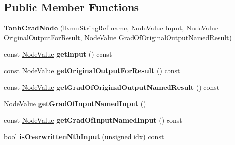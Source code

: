 \subsection*{Public Member Functions}
\begin{DoxyCompactItemize}
\item 
\mbox{\label{classglow_1_1_tanh_grad_node_a22acf1da0c7ed69537ed7512a9f4f842}} 
{\bfseries Tanh\+Grad\+Node} (llvm\+::\+String\+Ref name, \hyperlink{structglow_1_1_node_value}{Node\+Value} Input, \hyperlink{structglow_1_1_node_value}{Node\+Value} Original\+Output\+For\+Result, \hyperlink{structglow_1_1_node_value}{Node\+Value} Grad\+Of\+Original\+Output\+Named\+Result)
\item 
\mbox{\label{classglow_1_1_tanh_grad_node_ad4e3ce62981a375538c398e67b4afa2d}} 
const \hyperlink{structglow_1_1_node_value}{Node\+Value} {\bfseries get\+Input} () const
\item 
\mbox{\label{classglow_1_1_tanh_grad_node_a8a42618c75035f80bacc2eef87f86b10}} 
const \hyperlink{structglow_1_1_node_value}{Node\+Value} {\bfseries get\+Original\+Output\+For\+Result} () const
\item 
\mbox{\label{classglow_1_1_tanh_grad_node_a02a35f1852827dfee577ad5622c73b28}} 
const \hyperlink{structglow_1_1_node_value}{Node\+Value} {\bfseries get\+Grad\+Of\+Original\+Output\+Named\+Result} () const
\item 
\mbox{\label{classglow_1_1_tanh_grad_node_abf8cb7d68708fe18da26068a115cc41e}} 
\hyperlink{structglow_1_1_node_value}{Node\+Value} {\bfseries get\+Grad\+Of\+Input\+Named\+Input} ()
\item 
\mbox{\label{classglow_1_1_tanh_grad_node_ad9e785ee79c5b83f6e1e38160f171ef6}} 
const \hyperlink{structglow_1_1_node_value}{Node\+Value} {\bfseries get\+Grad\+Of\+Input\+Named\+Input} () const
\item 
\mbox{\label{classglow_1_1_tanh_grad_node_ab5862efa793c9fb9e1a0298474312052}} 
bool {\bfseries is\+Overwritten\+Nth\+Input} (unsigned idx) const
\item 

\end{DoxyCompactItemize}
